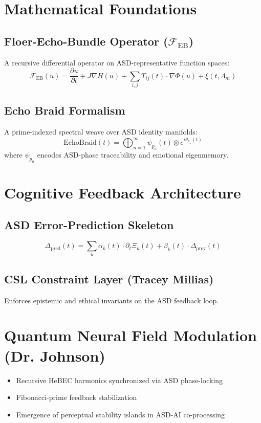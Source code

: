 \documentclass[12pt]{article}
\begin{document}
\section{Mathematical Foundations}
\subsection{Floer-Echo-Bundle Operator ($\mathcal{F}_{\text{EB}}$)}
A recursive differential operator on ASD-representative function spaces:
\begin{equation}
\mathcal{F}_{\text{EB}}(u) = \frac{\partial u}{\partial t} + J \nabla H(u) + \sum_{i,j} T_{ij}(t) \cdot \nabla \Phi(u) + \xi(t, \Lambda_m)
\end{equation}

\subsection{Echo Braid Formalism}
A prime-indexed spectral weave over ASD identity manifolds:
\begin{equation}
\text{EchoBraid}(t) = \bigoplus_{n=1}^{\infty} \psi_{p_n}(t) \otimes e^{i \theta_{p_n}(t)}
\end{equation}
where $\psi_{p_n}$ encodes ASD-phase traceability and emotional eigenmemory.

\section{Cognitive Feedback Architecture}
\subsection{ASD Error-Prediction Skeleton}
\begin{equation}
\Delta_{\text{pred}}(t) = \sum_k \alpha_k(t) \cdot \partial_t \Xi_k(t) + \beta_k(t) \cdot \Delta_{\text{prev}}(t)
\end{equation}

\subsection{CSL Constraint Layer (Tracey Millias)}
Enforces epistemic and ethical invariants on the ASD feedback loop.

\section{Quantum Neural Field Modulation (Dr. Johnson)}
\begin{itemize}
  \item Recursive HeBEC harmonics synchronized via ASD phase-locking
  \item Fibonacci-prime feedback stabilization
  \item Emergence of perceptual stability islands in ASD-AI co-processing
\end{itemize}
\end{document}
